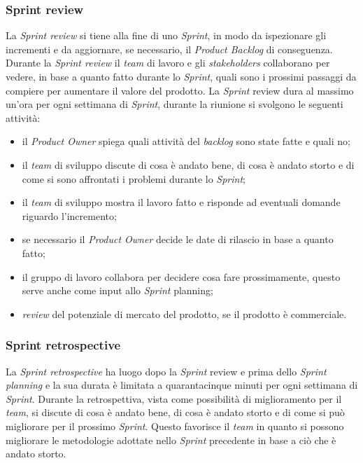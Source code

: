 \subsubsection{Sprint review}
La \textit{Sprint review} si tiene alla fine di uno \textit{Sprint}, in modo da ispezionare gli incrementi e da aggiornare, se necessario, il \textit{Product Backlog} di conseguenza. Durante la \textit{Sprint review} il \textit{team} di lavoro e gli \textit{stakeholders} collaborano per vedere, in base a quanto fatto durante lo \textit{Sprint}, quali sono i prossimi passaggi da compiere per aumentare il valore del prodotto. La \textit{Sprint} review dura al massimo un'ora per ogni settimana di \textit{Sprint}, durante la riunione si svolgono le seguenti attività:
\begin{itemize}
    \item il \textit{Product Owner} spiega quali attività del \textit{backlog} sono state fatte e quali no;
    \item il \textit{team} di sviluppo discute di cosa è andato bene, di cosa è andato storto e di come si sono affrontati i problemi durante lo \textit{Sprint};
    \item il \textit{team} di sviluppo mostra il lavoro fatto e risponde ad eventuali domande riguardo l'incremento;
    \item se necessario il \textit{Product Owner} decide le date di rilascio in base a quanto fatto;
    \item il gruppo di lavoro collabora per decidere cosa fare prossimamente, questo serve anche come input allo \textit{Sprint} planning;
    \item \textit{review} del potenziale di mercato del prodotto, se il prodotto è commerciale.
\end{itemize}

\subsubsection{Sprint retrospective}
La \textit{Sprint retrospective} ha luogo dopo la \textit{Sprint} review e prima dello \textit{Sprint} \textit{planning} e la sua durata è limitata a quarantacinque minuti per ogni settimana di \textit{Sprint}. Durante la retrospettiva, vista come possibilità di miglioramento per il \textit{team}, si discute di cosa è andato bene, di cosa è andato storto e di come si può migliorare per il prossimo \textit{Sprint}. Questo favorisce il \textit{team} in quanto si possono migliorare le metodologie adottate nello \textit{Sprint} precedente in base a ciò che è andato storto.